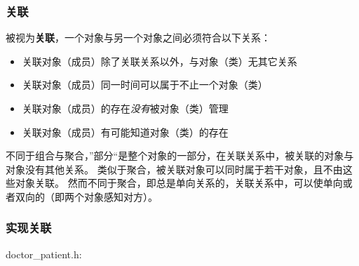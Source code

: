\documentclass[../../LearnCpp.tex]{subfiles}
\begin{document}

\subsubsection*{关联}

被视为\textbf{关联}，一个对象与另一个对象之间必须符合以下关系：

\begin{itemize}
    \item 关联对象（成员）除了关联关系以外，与对象（类）无其它关系
    \item 关联对象（成员）同一时间可以属于不止一个对象（类）
    \item 关联对象（成员）的存在\textit{没有}被对象（类）管理
    \item 关联对象（成员）有可能知道对象（类）的存在
\end{itemize}

不同于组合与聚合，”部分“是整个对象的一部分，在关联关系中，被关联的对象与对象没有其他关系。
类似于聚合，被关联对象可以同时属于若干对象，且不由这些对象关联。
然而不同于聚合，即总是单向关系的，关联关系中，可以使单向或者双向的（即两个对象感知对方）。

\subsubsection*{实现关联}

doctor\_patient.h:
\end{document}
